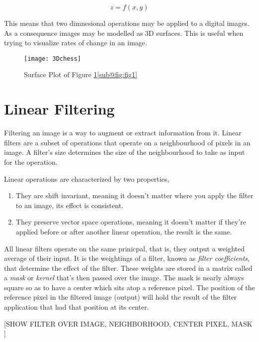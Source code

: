 \begin{equation}
    z = f(x,y)
    \label{eq:2Dfunc}
\end{equation}

This means that two dimnesional operations may be applied to a digital images. As a consequence images may be modelled as 3D surfaces. This is useful when trying to visualize rates of change in an image.

\begin{figure}[ht!]
  \centering
  \centering\texttt{[image: 3Dchess]}
  \caption{\label{fig:fig1} Surface Plot of Figure \ref{fig:fig1}\ref{sub@fig:fig1}}
\end{figure}




\section{Linear Filtering}

Filtering an image is a way to augment or extract information from it. Linear filters are a subset of operations that operate on a neighbourhood of pixels in an image. A filter's size determines the size of the neighbourhood to take as input for the operation.

Linear operations are characterized by two properties,

\begin{enumerate}
  \item They are shift invariant, meaning it doesn't matter where you apply the filter to an image, its effect is consistent.
  \item They preserve vector space operations, meaning it doesn't matter if they're applied before or after another linear operation, the result is the same.
\end{enumerate}

All linear filters operate on the same prinicpal, that is, they output a weighted average of their input. It is the weightings of a filter, known as \emph{filter coefficients}, that determine the effect of the filter. These weights are stored in a matrix called a \emph{mask} or \emph{kernel} that's then passed over the image. The mask is nearly always square so as to have a center which sits atop a reference pixel. The position of the reference pixel in the filtered image (output) will hold the result of the filter application that had that position at its center.

[SHOW FILTER OVER IMAGE, NEIGHBORHOOD, CENTER PIXEL, MASK ]

